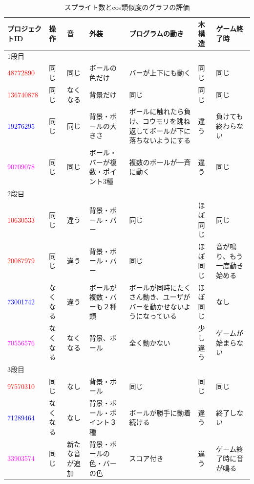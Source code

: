 \documentclass[a4paper,10pt,onecolumn,oneside,openany]{jsbook}
\begin{document}
\begin{table}[h]
 \scriptsize
 \caption{スプライト数とcos類似度のグラフの評価}
 \label{splite}
 \begin{center}
\begin{tabular}{|p{1.7cm}||p{1cm}|p{1cm}|p{1.7cm}|p{2cm}|p{1cm}|p{1.7cm}|} \hline

プロジェクトID & 操作 & 音 & 外装 & プログラムの動き & 木構造 & ゲーム終了時 \\ \hline \hline
1段目 &  &  &  &  &  &  \\ \hline
\textcolor{red}{48772890} & 同じ & 同じ & ボールの色だけ & バーが上下にも動く & 同じ & 同じ \\ \hline
\textcolor{red}{136740878} & 同じ & なくなる & 背景だけ & 同じ & 同じ & 同じ \\ \hline
\textcolor{blue}{19276295} & 同じ & 同じ & 背景・ボールの大きさ & ボールに触れたら負け、コウモリを跳ね返してボールが下に落ちないようにする & 違う & 負けても終わらない \\ \hline
\textcolor{magenta}{90709078} & 同じ & 同じ & ボール・バーが複数・ポイント3種 & 複数のボールが一斉に動く & 違う & 同じ \\ \hline

2段目 &  &  &  &  &  &  \\ \hline
\textcolor{red}{10630533} & 同じ & 違う & 背景・ボール・バー & 同じ & ほぼ同じ & 同じ \\ \hline
\textcolor{red}{20087979} & 同じ & 違う & 背景・ボール・バー & 同じ & ほぼ同じ & 音が鳴り、もう一度動き始める \\ \hline
\textcolor{blue}{73001742} & なくなる & 違う & ボールが複数・バーも２種類 & ボールが同時にたくさん動き、ユーザがバーを動かせないようになっている & ほぼ同じ & なし \\ \hline
\textcolor{magenta}{70556576} & なくなる & なくなる & 背景、ボール & 全く動かない & 少し違う & ゲームが始まらない \\ \hline

3段目 &  &  &  &  &  &  \\ \hline
\textcolor{red}{97570310} & 同じ & なし & 背景・ボール & 同じ & 同じ & 同じ \\ \hline
\textcolor{blue}{71289464} & なくなる & なし & 背景・ボール・ポイント３種 & ボールが勝手に動着続ける & 違う & 終了しない \\ \hline
\textcolor{magenta}{33903574} & 同じ & 新たな音が追加 & 背景・ボールの色・バーの色 & スコア付き & 違う & ゲーム終了時に音が鳴る \\ \hline


\end{tabular}
\end{center}
\end{table}
\end{document}
